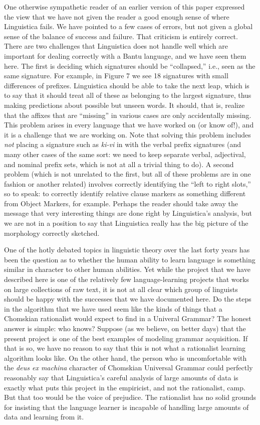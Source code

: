 \documentclass[output=paper,colorlinks,citecolor=brown]{langscibook}
\begin{document}
One otherwise sympathetic reader of an earlier version of this paper expressed the view that we have not given the reader a good enough sense of where Linguistica fails. We have pointed to a few cases of errors, but not given a global sense of the balance of success and failure.  That criticism is entirely correct. There are two challenges that Linguistica does not handle well which are important for dealing correctly with a Bantu language, and we have seen them here. The first is deciding which signatures should be ``collapsed,'' i.e., seen as the same signature. For example, in Figure 7 we see 18 signatures with small differences of prefixes. Linguistica should be able to take the next leap, which is to say that it should treat all of these as belonging to the largest signature, thus making predictions about possible but unseen words. It should, that is, realize that the affixes that are ``missing'' in various cases are only accidentally missing. This problem arises in every language that we have worked on (or know of!), and it is a challenge that we are working on. Note that solving this problem includes {\em not} placing a signature such as {\em ki-vi} in with the verbal prefix signatures (and many other cases of the same sort: we need to keep separate verbal, adjectival, and nominal prefix sets, which is not at all a trivial thing to do). A second problem (which is not unrelated to the first, but all of these problems are in one fashion or another related) involves correctly identifying the ``left to right slots,'' so to speak: to correctly identify relative clause markers as something different from Object Markers, for example. Perhaps the reader should take away the message that very interesting things are done right by Linguistica's analysis, but we are not in a position to say that Linguistica really has the big picture of the morphology correctly sketched. 

One of the hotly debated topics in linguistic theory over the last forty years has been the question as to whether the human ability to learn language is something similar in character to other human abilities. Yet while the project that we have described here is one of the relatively few language-learning projects that works on large collections of raw text, it is not at all clear which group of linguists should be happy with the successes that we have documented here. Do the steps in the algorithm that we have used seem like the kinds of things that a Chomskian rationalist would expect to find in a Univeral Grammar? The honest answer is simple: who knows? Suppose (as we believe, on better days) that the present project is one of the best examples of modeling grammar acquisition. If that is so, we have no reason to say that this is not what a rationalist learning algorithm looks like. On the other hand, the person who is uncomfortable with the \textit{deus ex machina} character of Chomskian Universal Grammar could perfectly reasonably say that Linguistica's careful analysis of large amounts of data is exactly what puts this project in the empiricist, and not the rationalist, camp. But that too would be the voice of prejudice. The rationalist has no solid grounds for insisting that the language learner is incapable of handling large amounts of data and learning from it. 
\end{document}
